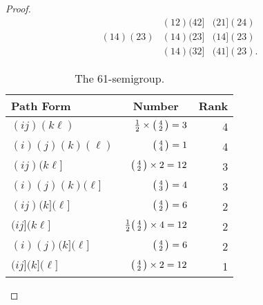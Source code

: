 \documentclass{surv-l}
\numberwithin{equation}{section}
\numberwithin{table}{section}
\numberwithin{figure}{section}
\theoremstyle{plain}
\theoremstyle{definition}
\begin{document}
\begin{proof}
\[\begin{matrix}
&(12)(42] &(21](24) \\
(14)(23) &(14)(23] &(14](23) \\
&(14)(32] &(41](23).
\end{matrix}
\]
\setcounter{table}{1}
\begin{table}[!h]
\caption{The 61-semigroup.}\label{tab6.26.2}
{\begin{tabular}{|lrr|}
\hline
\multicolumn{1}{|l}{\textbf{Path Form}} &\multicolumn{1}{c}{\textbf{Number}} &\multicolumn{1}{c|}{\textbf{Rank}} \\
\hline
$(ij)(k\ell)$ &$\frac{1}{2}\times \big(\kern0.5pt\begin{smallmatrix}4\\
2\end{smallmatrix}\kern0.5pt\big)=3$ &4 \\[3pt]
$(i)(j)(k)(\ell)$ &$\big(\kern0.5pt\begin{smallmatrix}
4\\
4\end{smallmatrix}\kern0.5pt\big)=1$ &4 \\
\hline
$(ij)(k\ell]$ &$\big(\kern0.5pt\begin{smallmatrix}4\\
2\end{smallmatrix}\kern0.5pt\big)\times 2=12$ &3 \\
$(i)(j)(k)(\ell]$ &$\big(\kern0.5pt\begin{smallmatrix}4\\
3\end{smallmatrix}\kern0.5pt\big)=4$ &3 \\
\hline
$(ij)(k](\ell]$ &$\big(\kern0.5pt\begin{smallmatrix}4\\
2\end{smallmatrix}\kern0.5pt\big)=6$ &2 \\
$(ij](k\ell]$ &$\frac{1}{2}\big(\kern0.5pt\begin{smallmatrix}4\\
2\end{smallmatrix}\kern0.5pt\big)\times 4=12$ &2 \\
$(i)(j)(k](\ell]$ &$\big(\kern0.5pt\begin{smallmatrix}4\\
2\end{smallmatrix}\kern0.5pt\big)=6$ &2 \\
\hline
$(ij](k](\ell]$ &$\big(\kern0.5pt\begin{smallmatrix}4\\
2\end{smallmatrix}\kern0.5pt\big)\times 2=12$ &1 \\

\end{tabular}}
\end{table}
\end{proof}
\end{document}
